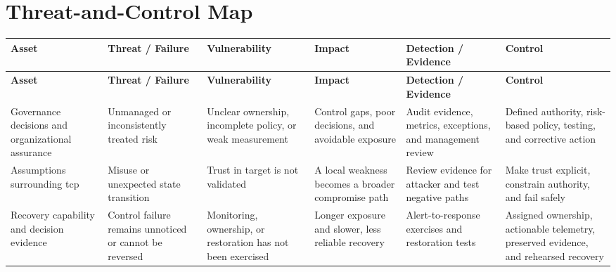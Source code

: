 \documentclass[11pt]{article}
\begin{document}
\section*{Threat-and-Control Map}
\begingroup\scriptsize\setlength{\tabcolsep}{2pt}
\begin{longtable}{>{\RaggedRight\arraybackslash}p{}>{\RaggedRight\arraybackslash}p{}>{\RaggedRight\arraybackslash}p{}>{\RaggedRight\arraybackslash}p{}>{\RaggedRight\arraybackslash}p{}>{\RaggedRight\arraybackslash}p{}}
\toprule\rowcolor{Navy}\color{white}\textbf{Asset} & \color{white}\textbf{Threat / Failure} & \color{white}\textbf{Vulnerability} & \color{white}\textbf{Impact} & \color{white}\textbf{Detection / Evidence} & \color{white}\textbf{Control}\\\midrule
\endfirsthead
\toprule\rowcolor{Navy}\color{white}\textbf{Asset} & \color{white}\textbf{Threat / Failure} & \color{white}\textbf{Vulnerability} & \color{white}\textbf{Impact} & \color{white}\textbf{Detection / Evidence} & \color{white}\textbf{Control}\\\midrule
\endhead
Governance decisions and organizational assurance & Unmanaged or inconsistently treated risk & Unclear ownership, incomplete policy, or weak measurement & Control gaps, poor decisions, and avoidable exposure & Audit evidence, metrics, exceptions, and management review & Defined authority, risk-based policy, testing, and corrective action\\\midrule
Assumptions surrounding tcp & Misuse or unexpected state transition & Trust in target is not validated & A local weakness becomes a broader compromise path & Review evidence for attacker and test negative paths & Make trust explicit, constrain authority, and fail safely\\\midrule
Recovery capability and decision evidence & Control failure remains unnoticed or cannot be reversed & Monitoring, ownership, or restoration has not been exercised & Longer exposure and slower, less reliable recovery & Alert-to-response exercises and restoration tests & Assigned ownership, actionable telemetry, preserved evidence, and rehearsed recovery\\\midrule
\bottomrule
\end{longtable}
\endgroup
\end{document}
